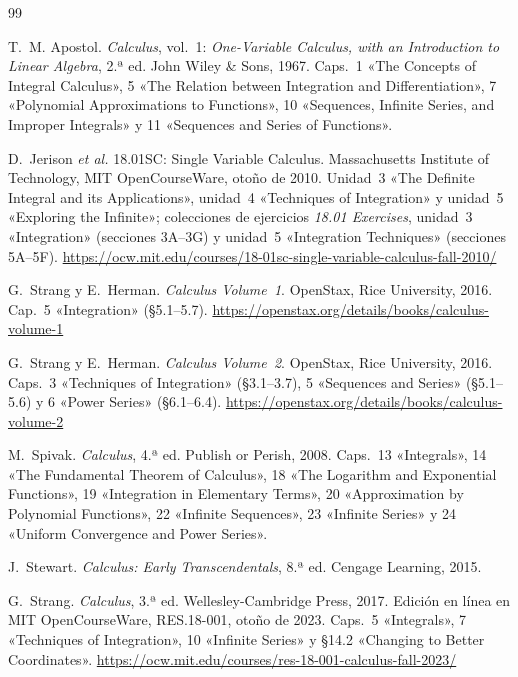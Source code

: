 \begin{thebibliography}{99}
\small

T.~M. Apostol.
\newblock \emph{Calculus}, vol.~1: \emph{One-Variable Calculus, with an Introduction to Linear Algebra}, 2.ª ed.
\newblock John Wiley \& Sons, 1967.
\newblock Caps.~1 «The Concepts of Integral Calculus», 5 «The Relation between Integration and Differentiation», 7 «Polynomial Approximations to Functions», 10 «Sequences, Infinite Series, and Improper Integrals» y 11 «Sequences and Series of Functions».

D.~Jerison \emph{et al.}
\newblock 18.01SC: Single Variable Calculus.
\newblock Massachusetts Institute of Technology, MIT OpenCourseWare, otoño de 2010. Unidad~3 «The Definite Integral and its Applications», unidad~4 «Techniques of Integration» y unidad~5 «Exploring the Infinite»; colecciones de ejercicios \emph{18.01 Exercises}, unidad~3 «Integration» (secciones 3A--3G) y unidad~5 «Integration Techniques» (secciones 5A--5F).
\newblock \url{https://ocw.mit.edu/courses/18-01sc-single-variable-calculus-fall-2010/}

G.~Strang y E.~Herman.
\newblock \emph{Calculus Volume~1}.
\newblock OpenStax, Rice University, 2016. Cap.~5 «Integration» (§5.1--5.7).
\newblock \url{https://openstax.org/details/books/calculus-volume-1}

G.~Strang y E.~Herman.
\newblock \emph{Calculus Volume~2}.
\newblock OpenStax, Rice University, 2016. Caps.~3 «Techniques of Integration» (§3.1--3.7), 5 «Sequences and Series» (§5.1--5.6) y 6 «Power Series» (§6.1--6.4).
\newblock \url{https://openstax.org/details/books/calculus-volume-2}

M.~Spivak.
\newblock \emph{Calculus}, 4.ª ed.
\newblock Publish or Perish, 2008.
\newblock Caps.~13 «Integrals», 14 «The Fundamental Theorem of Calculus», 18 «The Logarithm and Exponential Functions», 19 «Integration in Elementary Terms», 20 «Approximation by Polynomial Functions», 22 «Infinite Sequences», 23 «Infinite Series» y 24 «Uniform Convergence and Power Series».

J.~Stewart.
\newblock \emph{Calculus: Early Transcendentals}, 8.ª ed.
\newblock Cengage Learning, 2015.

G.~Strang.
\newblock \emph{Calculus}, 3.ª ed.
\newblock Wellesley-Cambridge Press, 2017. Edición en línea en MIT OpenCourseWare, RES.18-001, otoño de 2023. Caps.~5 «Integrals», 7 «Techniques of Integration», 10 «Infinite Series» y §14.2 «Changing to Better Coordinates».
\newblock \url{https://ocw.mit.edu/courses/res-18-001-calculus-fall-2023/}

\end{thebibliography}
